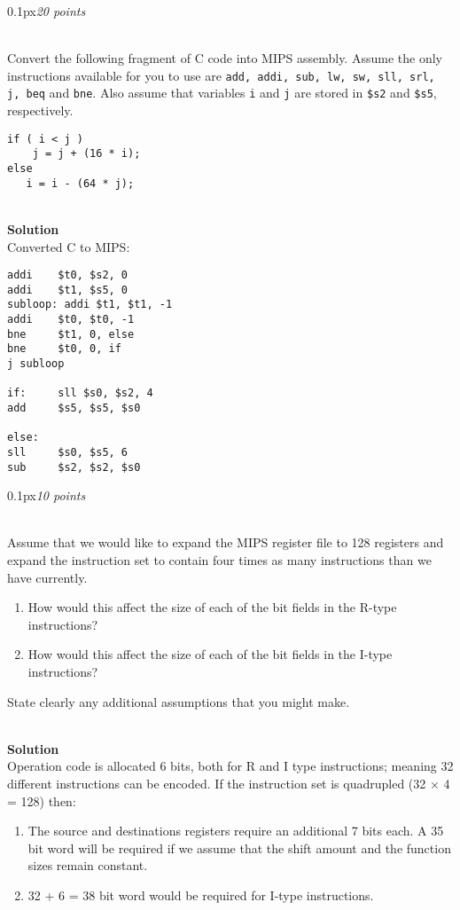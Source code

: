 \documentclass[11pt]{article}
\newcommand{\problem}[2]{\begin{adjustwidth}{0.1px}\noindent \framebox[1.2\width]{\large Problem #1}\hfill \emph{#2} \end{adjustwidth} \bigskip\\}
\newcommand{\code}[1]{{\texttt{#1}}}
\begin{document}
\newpage
\problem{4}{20 points}
Convert the following fragment of C code into MIPS assembly.  Assume the only instructions available for you to use are \code{add, addi, sub, lw, sw, sll, srl, j, beq} and \code{bne}. Also assume that variables \code{i} and \code{j} are stored in \code{\$s2} and \code{\$s5}, respectively.
\begin{lstlisting}[style=c]
if ( i < j ) 
    j = j + (16 * i);
else
   i = i - (64 * j); 
\end{lstlisting}
\bigskip \\
\textbf{Solution}\\
Converted C to MIPS:
\begin{lstlisting}[style=MIPS]
addi    $t0, $s2, 0
addi    $t1, $s5, 0
subloop: addi $t1, $t1, -1
addi    $t0, $t0, -1
bne     $t1, 0, else
bne     $t0, 0, if
j subloop

if:     sll $s0, $s2, 4
add     $s5, $s5, $s0

else:
sll     $s0, $s5, 6
sub     $s2, $s2, $s0
\end{lstlisting}






\newpage
\problem{5}{10 points}
Assume that we would like to expand the MIPS register file to 128 registers and expand the instruction set to contain four times as many instructions than we have currently.
\begin{enumerate}
	\item How would this affect the size of each of the bit fields in the R-type instructions?
	\item How would this affect the size of each of the bit fields in the I-type instructions?
\end{enumerate}
State clearly any additional assumptions that you might make.

\bigskip \\
\textbf{Solution}\\
Operation code is allocated 6 bits, both for R and I type instructions; meaning 32 different instructions can be encoded. If the instruction set is quadrupled (32 $\times$ 4 = 128) then:
\begin{enumerate}
	\item The source and destinations registers require an additional 7 bits each. A 35 bit word will be required if we assume that the shift amount and the function sizes remain constant.
	\item 32 + 6 = 38 bit word would be required for I-type instructions.
\end{enumerate}
\end{document}
